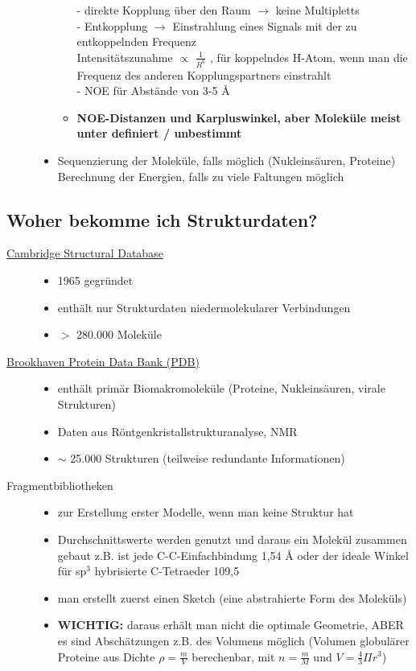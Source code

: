 \documentclass[12pt,a4paper,oneside,normalheadings,abstracton,liststotoc,bibtotoc,titlepage,pdftex]{scrartcl}
\begin{document}
\begin{description}
\begin{itemize}
\begin{itemize}
- direkte Kopplung über den Raum $\rightarrow$ keine Multipletts\\
- Entkopplung $\rightarrow$ Einstrahlung eines Signals mit der zu entkoppelnden Frequenz\\
Intensitätszunahme $\propto$ $\frac{1}{R^6}$ , für koppelndes H-Atom, wenn man die Frequenz des anderen Kopplungspartners einstrahlt\\
- NOE für Abstände von 3-5 \r{A}
\item \textbf{NOE-Distanzen und Karpluswinkel, aber Moleküle meist unter definiert / unbestimmt}
\end{itemize}
\item Sequenzierung der Moleküle, falls möglich (Nukleinsäuren, Proteine)
Berechnung der Energien, falls zu viele Faltungen möglich
\end{itemize}
\end{description}

\subsection{Woher bekomme ich Strukturdaten?}
\begin{description}
\item[\href{http://www.ccdc.cam.ac.uk/products/csd/}{Cambridge Structural Database}]
\begin{itemize}
\item 1965 gegründet
\item enthält nur Strukturdaten niedermolekularer Verbindungen
\item $>$ 280.000 Moleküle
\end{itemize}
\item[\href{http://www.rcsb.org/pdb/home/home.do}{Brookhaven Protein Data Bank (PDB)}]
\begin{itemize}
\item enthält primär Biomakromoleküle (Proteine, Nukleinsäuren, virale Strukturen)
\item Daten aus Röntgenkristallstrukturanalyse, NMR
\item $\sim$ 25.000 Strukturen (teilweise redundante Informationen)
\end{itemize}
\item[Fragmentbibliotheken]
\begin{itemize}
\item zur Erstellung erster Modelle, wenn man keine Struktur hat
\item Durchschnittswerte werden genutzt und daraus ein Molekül zusammen gebaut z.B. ist jede C-C-Einfachbindung 1,54 \r{A} oder der ideale Winkel für sp$^3$ hybrisierte C-Tetraeder 109,5\degree
\item man erstellt zuerst einen Sketch (eine abstrahierte Form des Moleküls)
\item \textbf{WICHTIG:} daraus erhält man nicht die optimale Geometrie, ABER es sind Abschätzungen z.B. des Volumens möglich (Volumen globulärer Proteine aus Dichte $\rho=\frac{m}{V}$ berechenbar, mit $n=\frac{m}{M}$ und $V=\frac{4}{3}\Pi r^3$)
\end{itemize}
\end{description}
\end{document}
